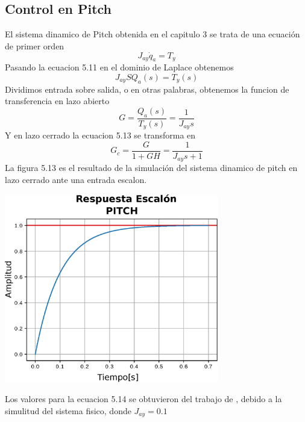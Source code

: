 \subsection{Control en Pitch}
El sistema dinamico de Pitch obtenida en el capitulo 3 se trata de una ecuación de primer orden
\begin{equation}
	J_{ay}\dot{q}_a = T_y
\end{equation}
Pasando la ecuacion 5.11 en el dominio de Laplace obtenemos
\begin{equation}
	J_{ay}SQ_a(s) = T_y(s)
\end{equation}
Dividimos entrada sobre salida, o en otras palabras, obtenemos la funcion de transferencia en lazo abierto
\begin{equation}
	G = \frac{Q_a(s)}{T_y(s)} =  \frac{1}{J_{ay}s}
\end{equation}
Y en lazo cerrado la ecuacion 5.13 se transforma en 
\begin{equation}
	G_c = \frac{G}{1 +GH} = \frac{1}{J_{ay}s+1}
\end{equation}
La figura 5.13 es el resultado de la simulación del sistema dinamico de pitch en lazo cerrado ante una entrada escalon.
\begin{center}
	\includegraphics[width=0.7\textwidth]{Contenido/Cuerpo/Capitulo5/Fig23.eps}
	\label{Fig4}
\end{center}
Los valores para la ecuacion 5.14 se obtuvieron del trabajo de \cite{Paper::Abdo2013}, debido a la simulitud del sistema fisico, donde 
$J_{ay} = 0.1$ 

